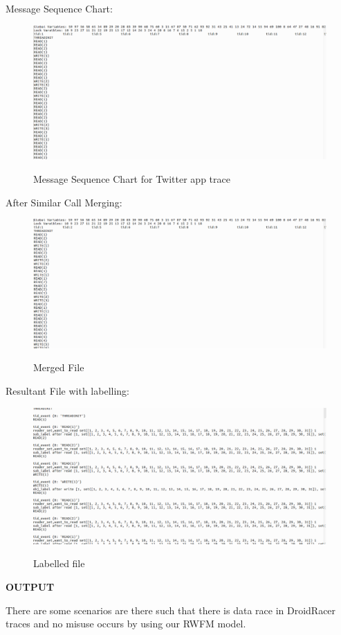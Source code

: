\documentclass[11pt]{report}
\begin{document}
\begin{description}
Message Sequence Chart:\\
\begin{figure}
\centering
\includegraphics[width=150mm]{./images/msg-traces.png}\\
\caption{Message Sequence Chart for Twitter app trace}
\end{figure}
After Similar Call Merging:\\
\begin{figure}
\centering
\includegraphics[width=150mm]{./images/merged.png}\\
\caption{Merged File}
\end{figure}
Resultant File with labelling:\\
\begin{figure}
\centering
\includegraphics[width=150mm]{./images/output.png}\\
\caption{Labelled file}
\end{figure}
\textbf{OUTPUT}\\
\par There are some scenarios are there such that there is data race in DroidRacer traces and no misuse occurs by using our RWFM model.\\

\end{description}
\end{document}
